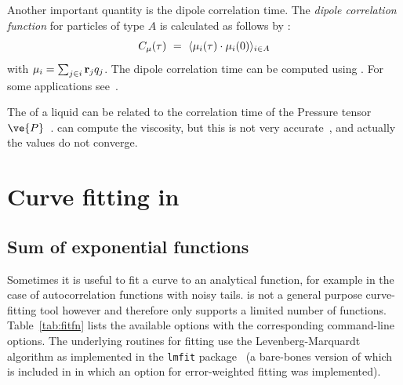 Another important quantity is the dipole correlation time. The {\em dipole 
correlation function} for particles of type $A$ is calculated as follows by 
{\tt {}}:
\begin{equation}
C_{\mu} (\tau) ~=~
\langle {\bf \mu}_i(\tau) \cdot {\bf \mu}_i(0) \rangle_{i \in A}
\end{equation}
with ${\bf \mu}_i = \sum_{j \in i} {\bf r}_j q_j$. The dipole correlation time 
can be computed using .
For some applications see~\cite{Spoel98a}.

The  of a liquid can be related to the correlation 
time of the Pressure tensor $\ve{P}$~\cite{PSmith93c,Balasubramanian96}.
{\tt {}} can compute the viscosity,
but this is not very accurate~\cite{Hess2002a}, and 
actually the values do not converge.


\section{Curve fitting in \gromacs}
\subsection{Sum of exponential functions}
Sometimes it is useful to fit a curve to an analytical function, for
example in the case of autocorrelation functions with noisy
tails. {\gromacs} is not a general purpose curve-fitting tool however
and therefore {\gromacs} only supports a limited number of
functions. 
Table~\ref{tab:fitfn} lists the available options with the
corresponding command-line options. The underlying routines for
fitting use the Levenberg-Marquardt algorithm as implemented in the
{\tt lmfit} package~\cite{lmfit} (a bare-bones version of which is
included in {\gromacs} in which an option for error-weighted fitting
was implemented). 

